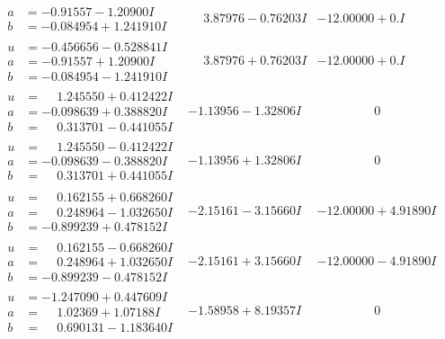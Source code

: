 \documentclass[1p]{elsarticle_modified}
\theoremstyle{definition}
\begin{document}
$$\begin{array}{c|c|c}
\begin{aligned}
a &= -0.91557 - 1.20900 I \\
b &= -0.084954 + 1.241910 I\end{aligned}
 & \phantom{-}3.87976 - 0.76203 I & -12.00000 + 0. I\phantom{ +0.000000I} \\ \hline\begin{aligned}
u &= -0.456656 - 0.528841 I \\
a &= -0.91557 + 1.20900 I \\
b &= -0.084954 - 1.241910 I\end{aligned}
 & \phantom{-}3.87976 + 0.76203 I & -12.00000 + 0. I\phantom{ +0.000000I} \\ \hline\begin{aligned}
u &= \phantom{-}1.245550 + 0.412422 I \\
a &= -0.098639 + 0.388820 I \\
b &= \phantom{-}0.313701 - 0.441055 I\end{aligned}
 & -1.13956 - 1.32806 I & \phantom{-0.000000 } 0 \\ \hline\begin{aligned}
u &= \phantom{-}1.245550 - 0.412422 I \\
a &= -0.098639 - 0.388820 I \\
b &= \phantom{-}0.313701 + 0.441055 I\end{aligned}
 & -1.13956 + 1.32806 I & \phantom{-0.000000 } 0 \\ \hline\begin{aligned}
u &= \phantom{-}0.162155 + 0.668260 I \\
a &= \phantom{-}0.248964 - 1.032650 I \\
b &= -0.899239 + 0.478152 I\end{aligned}
 & -2.15161 - 3.15660 I & -12.00000 + 4.91890 I \\ \hline\begin{aligned}
u &= \phantom{-}0.162155 - 0.668260 I \\
a &= \phantom{-}0.248964 + 1.032650 I \\
b &= -0.899239 - 0.478152 I\end{aligned}
 & -2.15161 + 3.15660 I & -12.00000 - 4.91890 I \\ \hline\begin{aligned}
u &= -1.247090 + 0.447609 I \\
a &= \phantom{-}1.02369 + 1.07188 I \\
b &= \phantom{-}0.690131 - 1.183640 I\end{aligned}
 & -1.58958 + 8.19357 I & \phantom{-0.000000 } 0 \\ \hline\begin{aligned}

\end{aligned}
\end{array}$$
\end{document}
